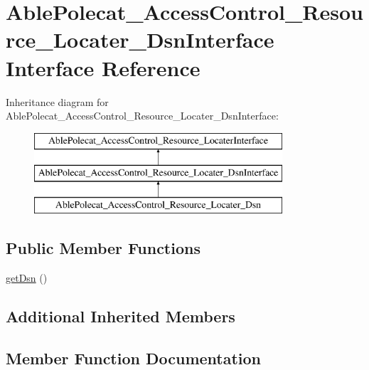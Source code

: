 \hypertarget{interface_able_polecat___access_control___resource___locater___dsn_interface}{}\section{Able\+Polecat\+\_\+\+Access\+Control\+\_\+\+Resource\+\_\+\+Locater\+\_\+\+Dsn\+Interface Interface Reference}
\label{interface_able_polecat___access_control___resource___locater___dsn_interface}
Inheritance diagram for Able\+Polecat\+\_\+\+Access\+Control\+\_\+\+Resource\+\_\+\+Locater\+\_\+\+Dsn\+Interface\+:\begin{figure}[H]
\begin{center}
\leavevmode
\includegraphics[height=3.000000cm]{interface_able_polecat___access_control___resource___locater___dsn_interface}
\end{center}
\end{figure}
\subsection*{Public Member Functions}
\begin{DoxyCompactItemize}
\item 
\hyperlink{interface_able_polecat___access_control___resource___locater___dsn_interface_a4a0bf8061a4ee59b487f17625cb37e13}{get\+Dsn} ()
\end{DoxyCompactItemize}
\subsection*{Additional Inherited Members}


\subsection{Member Function Documentation}
\hypertarget{interface_able_polecat___access_control___resource___locater___dsn_interface_a4a0bf8061a4ee59b487f17625cb37e13}{}
